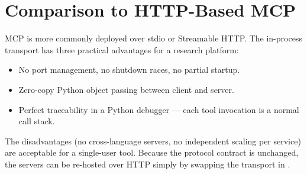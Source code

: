 \section{Comparison to HTTP-Based MCP}
\label{sec:vs-http}

MCP is more commonly deployed over stdio or Streamable HTTP. The
in-process transport has three practical advantages for a research
platform:

\begin{itemize}[leftmargin=1.4em]
  \item No port management, no shutdown races, no partial startup.
  \item Zero-copy Python object passing between client and server.
  \item Perfect traceability in a Python debugger --- each tool
        invocation is a normal call stack.
\end{itemize}

The disadvantages (no cross-language servers, no independent scaling
per service) are acceptable for a single-user tool. Because the
protocol contract is unchanged, the servers can be re-hosted over
HTTP simply by swapping the transport in .
